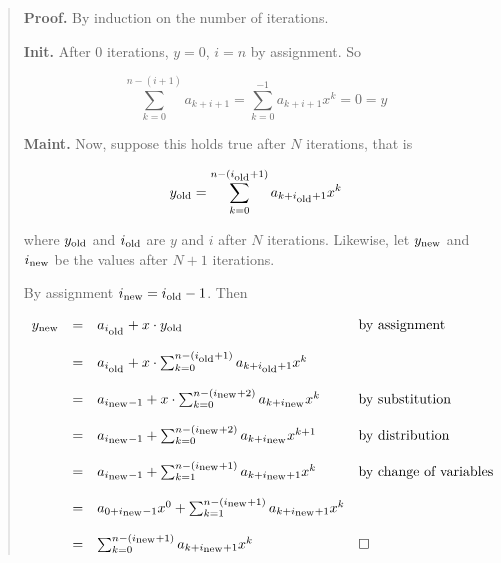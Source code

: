 \documentclass{article}
\newcommand\old{_{\mbox{\scriptsize old}}}
\newcommand\nw{_{\mbox{\scriptsize new}}}
\begin{document}
\begin{quote}
\textbf{Proof.} By induction on the number of iterations.

\textbf{Init.}
After 0 iterations, $y = 0$, $i = n$ by assignment.
So

\[
\sum_{k=0}^{n-(i + 1)} a_{k + i + 1} = \sum_{k=0}^{-1} a_{k + i + 1} x^k = 0
= y 
\]

\textbf{Maint.} Now, suppose this holds true after $N$ iterations, that is

\[
y\old = \sum_{k=0}^{n-(i\old + 1)} a_{k + i\old + 1} x^k
\]

where $y\old$ and $i\old$ are $y$ and $i$ after $N$ iterations.
Likewise, let $y\nw$ and $i\nw$ be the values after
$N + 1$ iterations.

By assignment $i\nw = i\old - 1$.
Then


\[
\begin{array}{rcll}
y\nw &=& a_{i\old} + x \cdot y\old & \mbox{by assignment} \\ \\
&=& a_{i\old} + x\cdot 
\sum_{k=0}^{n - (i\old + 1)} a_{k + i\old + 1} x^k & \\ \\
&=& a_{i\nw - 1} + x\cdot 
\sum_{k=0}^{n - (i\nw + 2)} a_{k + i\nw} x^k & \mbox{by substitution} \\ \\
&=& a_{i\nw - 1} +  
\sum_{k=0}^{n - (i\nw + 2)} a_{k + i\nw} x^{k+1} & \mbox{by distribution} \\ \\
&=& a_{i\nw - 1} + 
\sum_{k=1}^{n - (i\nw  + 1)} a_{k + i\nw + 1} x^{k} 
& \mbox{by change of variables} \\ \\
&=& a_{0 + i\nw - 1} x^0 + 
\sum_{k=1}^{n - (i\nw + 1)} a_{k + i\nw + 1} x^{k} 
& \\ \\
&=& \sum_{k = 0}^{n - (i\nw + 1)} a_{k + i\nw + 1} x^k & \Box
\end{array}
\]

\end{quote}
\end{document}
